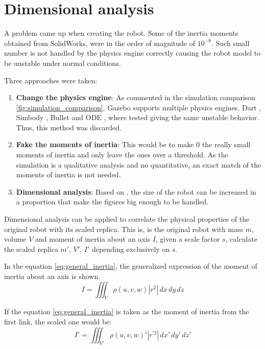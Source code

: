 \section{Dimensional analysis} %
\label{sec:dimensional_analysis}
A problem came up when creating the robot. 
Some of the inertia moments obtained from SolidWorks, were in the order of magnitude of $10^{-8}$.
Such small number is not handled by the physics engine correctly causing the robot model to be unstable under normal conditions.

Three approaches were taken:
\begin{enumerate}
  \item \textbf{Change the physics engine}: As commented in the simulation comparison \ref{fig:simulation_comparison}, Gazebo supports multiple physics engines. Dart \cite{dart}, Simbody \cite{simbody}, Bullet \cite{bullet} and ODE \cite{ode}, where tested giving the same unstable behavior. 
  Thus, this method was discarded.
  \item \textbf{Fake the moments of inertia}: This would be to make 0 the really small moments of inertia and only leave the ones over a threshold.
  As the simulation is a qualitative analysis and no quantitative, an exact match of the moments of inertia is not needed. 
  \item \textbf{Dimensional analysis}: Based on \cite{dimensional_analysis}, the size of the robot can be increased in a proportion that make the figures big enough to be handled.
\end{enumerate}

Dimensional analysis can be applied to correlate the physical properties of the original robot with its scaled replica.
This is, is the original robot with mass $m$, volume $V$ and moment of inertia about an axis $I$, given a scale factor $s$, calculate the scaled replica $m'$, $V'$, $I'$ depending exclusively on $s$.

In the equation \ref{eq:general_inertia}, the generalized expression of the moment of inertia about an axis is shown.
\begin{equation}
\label{eq:general_inertia}
  I = \iiint_V \rho(u,v,w) |r^{2}| \,dx\,dy\,dz
\end{equation}

If the equation \ref{eq:general_inertia} is taken as the moment of inertia from the first link, the scaled one would be:
\begin{equation}
\label{eq:general_inertia_2}
  I' = \iiint_{V'} \rho(u,v,w)' |r^{'2}| \,dx'\,dy'\,dz'
\end{equation}

